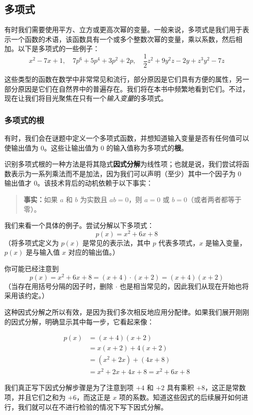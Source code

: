 \subsection{多项式}

有时我们需要使用平方、立方或更高次幂的变量。一般来说，多项式是我们用于表示一个函数的术语，该函数具有一个或多个整数次幂的变量，乘以系数，然后相加。以下是多项式的一些例子：
\[x^2 - 7x + 1,\quad 7p^6 + 5p^4 + 3p^2 + 2p,\quad \frac{1}{2}z^2 + 9y^2z - 2y + z^3y^2 - 7z\]

这些类型的函数在数学中非常常见和流行，部分原因是它们具有方便的属性，另一部分原因是它们在自然界中的普遍存在。我们将在本书中频繁地看到它们。不过，现在让我们将目光聚焦在只有一个\emph{输入变量}的多项式。

\subsubsection*{多项式的根}

有时，我们会在谜题中定义一个多项式函数，并想知道输入变量是否有任何值可以使输出值为 0。这些让输出值为 0 的输入值称为多项式的\textbf{根}。

识别多项式根的一种方法是将其隐式\textbf{因式分解}为线性项；也就是说，我们尝试将函数表示为一系列乘法而不是加法，因为我们可以声明（至少）其中一个因子为 $0$ 输出值才 $0$。该技术背后的动机依赖于以下事实：

\begin{quote}
    \textbf{事实：}如果 $a$ 和 $b$ 为实数且 $ab=0$，则 $a=0$ 或 $b=0$（或者两者都等于零）。
\end{quote}

\begin{example}
    我们来看一个具体的例子。尝试分解以下多项式：
    \[p(x) = x^2 + 6x + 8\]
    （将多项式定义为 $p(x)$ 是常见的表示法，其中 $p$ 代表多项式，$x$ 是输入变量，$p(x)$ 是与输入值 $x$ 对应的输出值。）

    你可能已经注意到
    \[p(x) = x^2 + 6x + 8 = (x + 4) \cdot (x + 2) = (x + 4)(x + 2)\]
    （当存在用括号分隔的因子时，删除 $\cdot$ 也是相当常见的，因此我们从现在开始也将采用该约定。）

    这种因式分解之所以有效，是因为我们多次相反地应用分配律。如果我们展开刚刚的因式分解，明确显示其中每一步，它看起来像：

    \begin{align*}
        p(x) &= (x + 4)(x + 2) \\
        &= x(x + 2) + 4(x + 2) \\
        &= (x^2 + 2x) + (4x + 8) \\
        &= x^2 + 2x + 4x + 8 = x^2 + 6x + 8
    \end{align*}

    我们真正写下因式分解步骤是为了注意到项 $+4$ 和 $+2$ 具有乘积 $+8$，这正是常数项，并且它们之和为 $+6$，而这正是 $x$ 项的系数。知道这些因式的后续展开如何进行，我们就可以在不进行检验的情况下写下因式分解。
\end{example}

